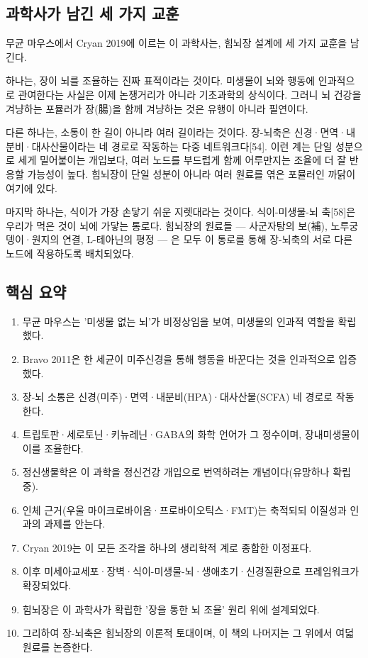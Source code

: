 \documentclass[12pt,oneside]{book}
\begin{document}
\subsection{과학사가 남긴 세 가지 교훈}

무균 마우스에서 Cryan 2019에 이르는 이 과학사는, 힘뇌장 설계에 세 가지 교훈을 남긴다.

하나는, 장이 뇌를 조율하는 진짜 표적이라는 것이다. 미생물이 뇌와 행동에 인과적으로 관여한다는 사실은 이제 논쟁거리가 아니라 기초과학의 상식이다. 그러니 뇌 건강을 겨냥하는 포뮬러가 장(腸)을 함께 겨냥하는 것은 유행이 아니라 필연이다.

다른 하나는, 소통이 한 길이 아니라 여러 길이라는 것이다. 장-뇌축은 신경·면역·내분비·대사산물이라는 네 경로로 작동하는 다중 네트워크다[54]. 이런 계는 단일 성분으로 세게 밀어붙이는 개입보다, 여러 노드를 부드럽게 함께 어루만지는 조율에 더 잘 반응할 가능성이 높다. 힘뇌장이 단일 성분이 아니라 여러 원료를 엮은 포뮬러인 까닭이 여기에 있다.

마지막 하나는, 식이가 가장 손닿기 쉬운 지렛대라는 것이다. 식이-미생물-뇌 축[58]은 우리가 먹은 것이 뇌에 가닿는 통로다. 힘뇌장의 원료들 — 사군자탕의 보(補), 노루궁뎅이·원지의 연결, L-테아닌의 평정 — 은 모두 이 통로를 통해 장-뇌축의 서로 다른 노드에 작용하도록 배치되었다.

\subsection{핵심 요약}

\begin{enumerate}[leftmargin=6mm,itemsep=1pt,topsep=2pt]
  \item 무균 마우스는 '미생물 없는 뇌'가 비정상임을 보여, 미생물의 인과적 역할을 확립했다.
  \item Bravo 2011은 한 세균이 미주신경을 통해 행동을 바꾼다는 것을 인과적으로 입증했다.
  \item 장-뇌 소통은 신경(미주)·면역·내분비(HPA)·대사산물(SCFA) 네 경로로 작동한다.
  \item 트립토판·세로토닌·키뉴레닌·GABA의 화학 언어가 그 정수이며, 장내미생물이 이를 조율한다.
  \item 정신생물학은 이 과학을 정신건강 개입으로 번역하려는 개념이다(유망하나 확립 중).
  \item 인체 근거(우울 마이크로바이옴·프로바이오틱스·FMT)는 축적되되 이질성과 인과의 과제를 안는다.
  \item Cryan 2019는 이 모든 조각을 하나의 생리학적 계로 종합한 이정표다.
  \item 이후 미세아교세포·장벽·식이-미생물-뇌·생애초기·신경질환으로 프레임워크가 확장되었다.
  \item 힘뇌장은 이 과학사가 확립한 '장을 통한 뇌 조율' 원리 위에 설계되었다.
  \item 그리하여 장-뇌축은 힘뇌장의 이론적 토대이며, 이 책의 나머지는 그 위에서 여덟 원료를 논증한다.
\end{enumerate}
\end{document}
